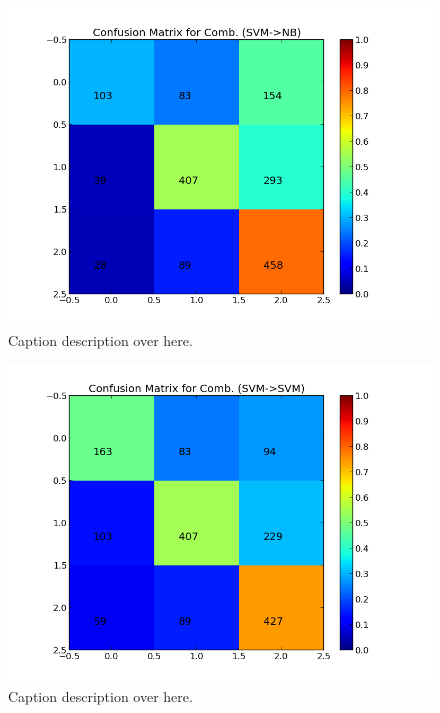 \begin{minipage}[c]{\linewidth}
     \centering
     \begin{minipage}{0.45\linewidth}
          \begin{figure}[H]
               \includegraphics[width=\linewidth]{../img/plots/grid/confusion_matrix_Comb-SVM-NB.png}
           \caption[Results overview across models]{Caption description over here.}
           \label{fig:confmat_svm_nb}
          \end{figure}
     \end{minipage}
     \hspace{0.05\linewidth}
     \begin{minipage}{0.45\linewidth}
          \begin{figure}[H]
               \includegraphics[width=\linewidth]{../img/plots/grid/confusion_matrix_Comb-SVM-SVM.png}
           \caption[Results overview across models]{Caption description over here.}
           \label{fig:confmat_svm_svm}
          \end{figure}
     \end{minipage} \\
 

\end{minipage}
